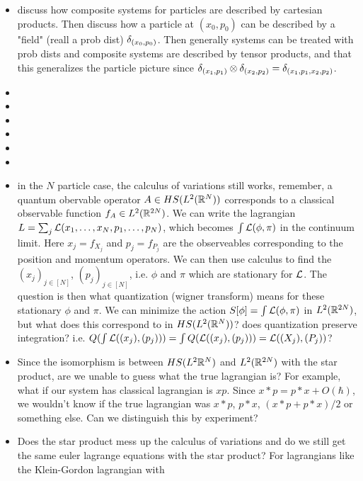 \documentclass{book}
\begin{document}
	\begin{itemize}
		\item discuss how composite systems for particles are described by cartesian products. Then discuss how a particle at $(x_0,p_0)$ can be described by a "field" (reall a prob dist) $\delta_{(x_0, p_0)}$. Then generally systems can be treated with prob dists and composite systems are described by tensor products, and that this generalizes the particle picture since $\delta_{(x_1, p_1)} \otimes \delta_{(x_2, p_2)} = \delta_{(x_1, p_1, x_2, p_2)}$. 
		\item {}
		\item {}
		\item {}
		\item {}
		\item {}
		\item {}
		\item in the $N$ particle case, the calculus of variations still works, remember, a quantum obervable operator $A \in HS(L^2(\mathbb{R}^N))$ corresponds to a classical observable function $f_A \in L^2(\mathbb{R}^{2N})$. We can write the lagrangian $L = \sum_{j} \mathcal{L}(x_1, \ldots, x_N, p_1, \ldots, p_N)$, which becomes $\int \mathcal{L}(\phi, \pi)$ in the continuum limit. Here $x_j = f_{X_j}$ and $p_j = f_{P_j}$ are the observeables corresponding to the position and momentum operators. We can then use calculus to find the $(x_j)_{j \in [N]}$, $(p_j)_{j \in [N]}$, i.e. $\phi$ and $\pi$ which are stationary for $\mathcal{L}$.    
		The question is then what quantization (wigner transform) means for these stationary $\phi$ and $\pi$. We can minimize the action $S[\phi] = \int \mathcal{L}(\phi, \pi)$ in $L^2(\mathbb{R}^{2N})$, but what does this correspond to in $HS(L^2(\mathbb{R}^N))$? does quantization preserve integration? i.e. $Q(\int \mathcal{L}((x_j), (p_j))) = \int Q(\mathcal{L}((x_j), (p_j))) = \mathcal{L}((X_j), (P_j))$? 
		\item Since the isomorphism is between $HS(L^2\mathbb{R}^N)$ and $L^2(\mathbb{R}^{2N})$ with the star product, are we unable to guess what the true lagrangian is? For example, what if our system has classical lagrangian is $xp$. Since $x*p = p*x + O(\hbar)$, we wouldn't know if the true lagrangian was $x*p$, $p*x$, $(x*p + p*x)/2$ or something else. Can we distinguish this by experiment? 
		\item Does the star product mess up the calculus of variations and do we still get the same euler lagrange equations with the star product? For lagrangians like the Klein-Gordon lagrangian with 
	\end{itemize}
	
\end{document}
